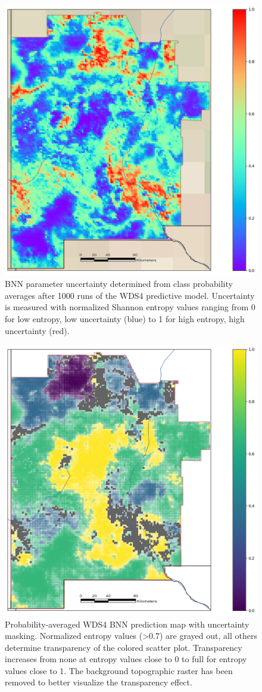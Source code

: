 \begin{figure}%
\centering
\includegraphics[width=.75\textwidth]{templates/images/Figure-BNN_Entropy_Map.png}
\caption[Bayesian neural network parameter uncertainty map]
{BNN parameter uncertainty determined from class probability averages after 1000 runs of the WDS4 predictive model. Uncertainty is measured with normalized Shannon entropy values ranging from 0 for low entropy, low uncertainty (blue) to 1 for high entropy, high uncertainty (red).}
\label{fig:bnn_entropy_map}
\end{figure}

\begin{figure}%
\centering
\includegraphics[width=.75\textwidth]{templates/images/Figure-BNN_All_Gradient_Map_Masked_whitebackground.png}
\caption[Parameter uncertainty mask on prediction map]
{Probability-averaged WDS4 BNN prediction map with uncertainty masking. Normalized entropy values (>0.7) are grayed out, all others determine transparency of the colored scatter plot. Transparency increases from none at entropy values close to 0 to full for entropy values close to 1. The background topographic raster has been removed to better visualize the transparency effect.}
\label{fig:bnn_masked_pred_map}
\end{figure}

